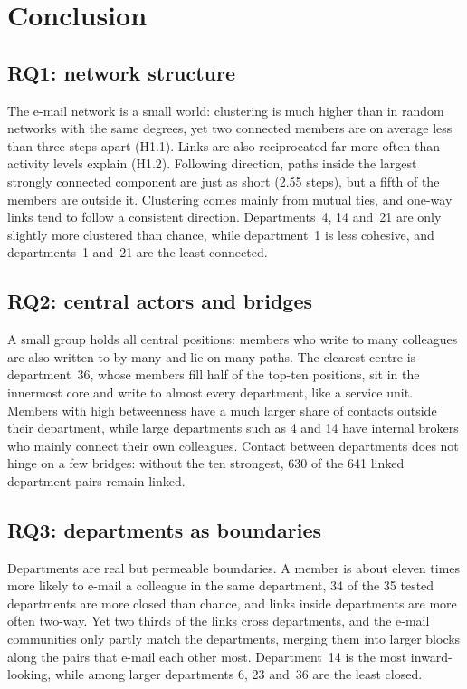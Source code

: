 \documentclass[12pt, a4paper]{article}
\begin{document}
\FloatBarrier
\section{Conclusion}
\label{conclusion}

\subsection{RQ1: network structure}
The e-mail network is a small world: clustering is much higher than in random
networks with the same degrees, yet two connected members are on average less
than three steps apart (H1.1). Links are also reciprocated far more often than
activity levels explain (H1.2). Following direction, paths inside the largest
strongly connected component are just as short (2.55 steps), but a fifth of
the members are outside it. Clustering comes mainly from mutual ties, and
one-way links tend to follow a consistent direction. Departments~4, 14 and~21
are only slightly more clustered than chance, while department~1 is less
cohesive, and departments~1 and~21 are the least connected.

\subsection{RQ2: central actors and bridges}
A small group holds all central positions: members who write to many
colleagues are also written to by many and lie on many paths. The clearest
centre is department~36, whose members fill half of the top-ten positions, sit
in the innermost core and write to almost every department, like a service
unit. Members with high betweenness have a much larger share of contacts
outside their department, while large departments such as 4 and 14 have
internal brokers who mainly connect their own colleagues. Contact between
departments does not hinge on a few bridges: without the ten strongest, 630 of
the 641 linked department pairs remain linked.

\subsection{RQ3: departments as boundaries}
Departments are real but permeable boundaries. A member is about eleven times
more likely to e-mail a colleague in the same department, 34 of the 35 tested
departments are more closed than chance, and links inside departments are more
often two-way. Yet two thirds of the links cross departments, and the e-mail
communities only partly match the departments, merging them into larger blocks
along the pairs that e-mail each other most. Department~14 is the most
inward-looking, while among larger departments 6, 23 and~36 are the least
closed.
\end{document}
